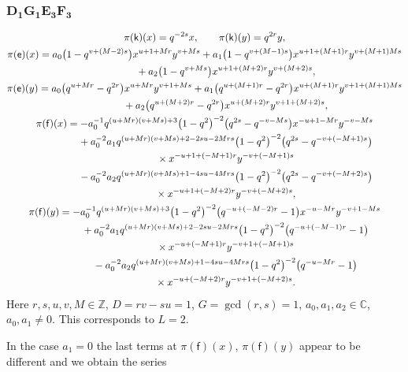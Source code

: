\documentclass[pdftex]{sigma}
\numberwithin{equation}{section}
\begin{document}
\subsubsection*{$\boldsymbol{D_1G_1E_3F_3}$}
\begin{gather*}
\pi(\mathsf{k})(x)= q^{-2s}x ,\qquad\pi(\mathsf{k})(y)=q^{2r}y ,\\
\pi(\mathsf{e})(x)= a_0\big(1-q^{v+(M-2)s}\big)x^{u+1+Mr}y^{v+Ms}+ a_1\big(1-q^{v+(M-1)s}\big)x^{u+1+(M+1)r}y^{v+(M+1)Ms}\\
\hphantom{\pi(\mathsf{e})(x)=}{} + a_2\big(1-q^{v+Ms}\big)x^{u+1+(M+2)r}y^{v+(M+2)s} ,\\
\pi(\mathsf{e})(y)= a_0\big(q^{u+Mr}-q^{2r}\big)x^{u+Mr}y^{v+1+Ms}+ a_1\big(q^{u+(M+1)r}-q^{2r}\big)x^{u+(M+1)r}y^{v+1+(M+1)Ms}\\
\hphantom{\pi(\mathsf{e})(y)=}{}+ a_2\big(q^{u+(M+2)r}-q^{2r}\big)x^{u+(M+2)r}y^{v+1+(M+2)s} ,\\
\pi(\mathsf{f})(x)= -a_0^{-1}q^{(u+Mr)(v+Ms)+3}\big(1-q^2\big)^{-2}\big(q^{2s}-q^{-v-Ms}\big)x^{-u+1-Mr}y^{-v-Ms}\\
\hphantom{\pi(\mathsf{f})(x)=}{}+ a_0^{-2}a_1q^{(u+Mr)(v+Ms)+2-2su-2Mrs}\big(1-q^2\big)^{-2}\big(q^{2s}-q^{-v+(-M+1)s}\big)\\
\hphantom{\pi(\mathsf{f})(x)=}{}\times x^{-u+1+(-M+1)r}y^{-v+(-M+1)s}\\
\hphantom{\pi(\mathsf{f})(x)=}{} -a_0^{-2}a_2q^{(u+Mr)(v+Ms)+1-4su-4Mrs}\big(1-q^2\big)^{-2}\big(q^{2s}-q^{-v+(-M+2)s}\big)\\
\hphantom{\pi(\mathsf{f})(x)=}{}\times x^{-u+1+(-M+2)r}y^{-v+(-M+2)s} ,\\
\pi(\mathsf{f})(y)= -a_0^{-1}q^{(u+Mr)(v+Ms)+3}\big(1-q^2\big)^{-2}\big(q^{-u+(-M-2)r}-1\big)x^{-u-Mr}y^{-v+1-Ms}\\
\hphantom{\pi(\mathsf{f})(y)=}{}+ a_0^{-2}a_1q^{(u+Mr)(v+Ms)+2-2su-2Mrs}\big(1-q^2\big)^{-2}\big(q^{-u+(-M-1)r}-1\big)\\
\hphantom{\pi(\mathsf{f})(y)=}{}\times x^{-u+(-M+1)r}y^{-v+1+(-M+1)s}\\
\hphantom{\pi(\mathsf{f})(y)=}{} -a_0^{-2}a_2q^{(u+Mr)(v+Ms)+1-4su-4Mrs}\big(1-q^2\big)^{-2}\big(q^{-u-Mr}-1\big)\\
\hphantom{\pi(\mathsf{f})(y)=}{}\times x^{-u+(-M+2)r}y^{-v+1+(-M+2)s} .
\end{gather*}
Here $r,s,u,v,M\in\mathbb{Z}$, $D=rv-su=1$, $G=\operatorname{gcd}(r,s)=1$, $a_0,a_1,a_2\in\mathbb{C}$, $a_0,a_1\ne 0$. This corresponds to $L=2$.

In the case $a_1=0$ the last terms at $\pi(\mathsf{f})(x)$, $\pi(\mathsf{f})(y)$ appear to be different and we obtain the series
\end{document}
